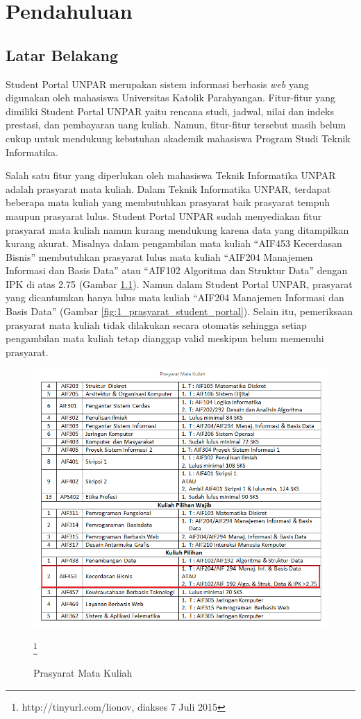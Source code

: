 \chapter{Pendahuluan}
\label{chap:pendahuluan}

\section{Latar Belakang}
\label{sec:latar_belakang}

Student Portal UNPAR\cite{studentportalunpar} merupakan sistem informasi berbasis \textit{web} yang digunakan oleh mahasiswa Universitas Katolik Parahyangan. Fitur-fitur yang dimiliki Student Portal UNPAR yaitu rencana studi, jadwal, nilai dan indeks prestasi, dan pembayaran uang kuliah. Namun, fitur-fitur tersebut masih belum cukup untuk mendukung kebutuhan akademik mahasiswa Program Studi Teknik Informatika. 

Salah satu fitur yang diperlukan oleh mahasiswa Teknik Informatika UNPAR adalah prasyarat mata kuliah. Dalam Teknik Informatika UNPAR, terdapat beberapa mata kuliah yang membutuhkan prasyarat baik prasyarat tempuh maupun prasyarat lulus. Student Portal UNPAR sudah menyediakan fitur prasyarat mata kuliah namun kurang mendukung karena data yang ditampilkan kurang akurat. Misalnya dalam pengambilan mata kuliah "`AIF453 Kecerdasan Bisnis"' membutuhkan prasyarat lulus mata kuliah "`AIF204 Manajemen Informasi dan Basis Data"' atau "`AIF102 Algoritma dan Struktur Data"' dengan IPK di atas 2.75 (Gambar \ref{fig:1_prasyarat_tinyurl}). Namun dalam Student Portal UNPAR, prasyarat yang dicantumkan hanya lulus mata kuliah "`AIF204 Manajemen Informasi dan Basis Data"' (Gambar \ref{fig:1_prasyarat_student_portal}). Selain itu, pemeriksaan prasyarat mata kuliah tidak dilakukan secara otomatis sehingga setiap pengambilan mata kuliah tetap dianggap valid meskipun belum memenuhi prasyarat.

\begin{figure}
	\centering
	\includegraphics[scale=0.5]{Gambar/contoh-tinyurl}
	\caption{Prasyarat Mata Kuliah} \footnote{http://tinyurl.com/lionov, diakses 7 Juli 2015}
	\label{fig:1_prasyarat_tinyurl}
\end{figure}

